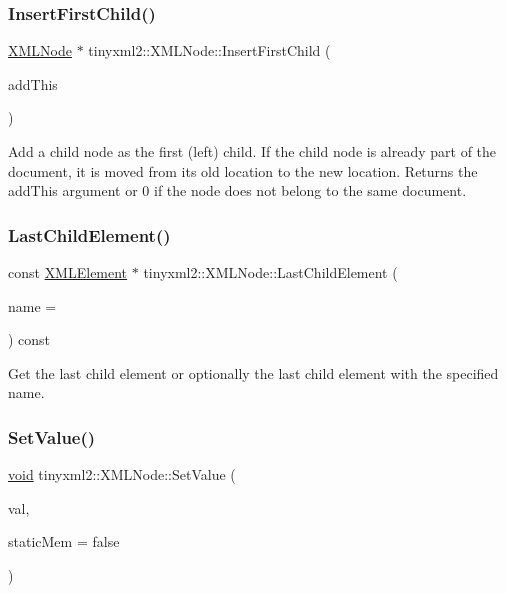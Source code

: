 \subsubsection{\texorpdfstring{Insert\+First\+Child()}{InsertFirstChild()}}
{\footnotesize\ttfamily \hyperlink{classtinyxml2_1_1_x_m_l_node}{X\+M\+L\+Node} $\ast$ tinyxml2\+::\+X\+M\+L\+Node\+::\+Insert\+First\+Child (\begin{DoxyParamCaption}\item[{\hyperlink{classtinyxml2_1_1_x_m_l_node}{X\+M\+L\+Node} $\ast$}]{add\+This }\end{DoxyParamCaption})}

Add a child node as the first (left) child. If the child node is already part of the document, it is moved from its old location to the new location. Returns the add\+This argument or 0 if the node does not belong to the same document. \mbox{\label{classtinyxml2_1_1_x_m_l_node_a609e02f02044f39b928d1a3e0de9f532}} 
\subsubsection{\texorpdfstring{Last\+Child\+Element()}{LastChildElement()}}
{\footnotesize\ttfamily const \hyperlink{classtinyxml2_1_1_x_m_l_element}{X\+M\+L\+Element} $\ast$ tinyxml2\+::\+X\+M\+L\+Node\+::\+Last\+Child\+Element (\begin{DoxyParamCaption}\item[{const char $\ast$}]{name = {} }\end{DoxyParamCaption}) const}

Get the last child element or optionally the last child element with the specified name. \mbox{\label{classtinyxml2_1_1_x_m_l_node_a09dd68cf9eae137579f6e50f36487513}} 
\subsubsection{\texorpdfstring{Set\+Value()}{SetValue()}}
{\footnotesize\ttfamily \hyperlink{interfacevoid}{void} tinyxml2\+::\+X\+M\+L\+Node\+::\+Set\+Value (\begin{DoxyParamCaption}\item[{const char $\ast$}]{val,  }\item[{bool}]{static\+Mem = {\ttfamily false} }\end{DoxyParamCaption})}

